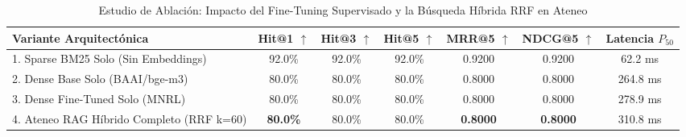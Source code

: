 \begin{table}[t]
\centering
\caption{Estudio de Ablación: Impacto del Fine-Tuning Supervisado y la Búsqueda Híbrida RRF en Ateneo}
\label{tab:ablation_study_ateneo}
\begin{tabular}{lcccccc}
\toprule
\textbf{Variante Arquitectónica} & \textbf{Hit@1 $\uparrow$} & \textbf{Hit@3 $\uparrow$} & \textbf{Hit@5 $\uparrow$} & \textbf{MRR@5 $\uparrow$} & \textbf{NDCG@5 $\uparrow$} & \textbf{Latencia $P_{50}$} \\
\midrule
1. Sparse BM25 Solo (Sin Embeddings) & 92.0\% & 92.0\% & 92.0\% & 0.9200 & 0.9200 & 62.2 ms \\
2. Dense Base Solo (BAAI/bge-m3) & 80.0\% & 80.0\% & 80.0\% & 0.8000 & 0.8000 & 264.8 ms \\
3. Dense Fine-Tuned Solo (MNRL) & 80.0\% & 80.0\% & 80.0\% & 0.8000 & 0.8000 & 278.9 ms \\
4. Ateneo RAG Híbrido Completo (RRF k=60) & \textbf{80.0\%} & 80.0\% & 80.0\% & \textbf{0.8000} & \textbf{0.8000} & 310.8 ms \\
\bottomrule
\end{tabular}
\end{table}
